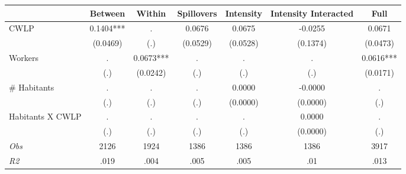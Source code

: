 \begin{tabular}{l*{6}{c}}\hline&\multicolumn{1}{c}{Between}&\multicolumn{1}{c}{Within}&\multicolumn{1}{c}{Spillovers}&\multicolumn{1}{c}{Intensity}&\multicolumn{1}{c}{Intensity Interacted}&\multicolumn{1}{c}{Full}\\ \hline 
CWLP & 0.1404*** & . & 0.0676 & 0.0675 & -0.0255 & 0.0671 \\
 & (0.0469) & (.) & (0.0529) & (0.0528) & (0.1374) & (0.0473) \\
Workers & . & 0.0673*** & . & . & . & 0.0616*** \\
 & (.) & (0.0242) & (.) & (.) & (.) & (0.0171) \\
\# Habitants & . & . & . & 0.0000 & -0.0000 & . \\
 & (.) & (.) & (.) & (0.0000) & (0.0000) & (.) \\
Habitants X CWLP & . & . & . & . & 0.0000 & . \\
 & (.) & (.) & (.) & (.) & (0.0000) & (.) \\
\hline \textit{Obs} & 2126 & 1924 & 1386 & 1386 & 1386 & 3917 \\ \textit{R2} & .019 & .004 & .005 & .005 & .01 & .013 \\ \hline \end{tabular}
